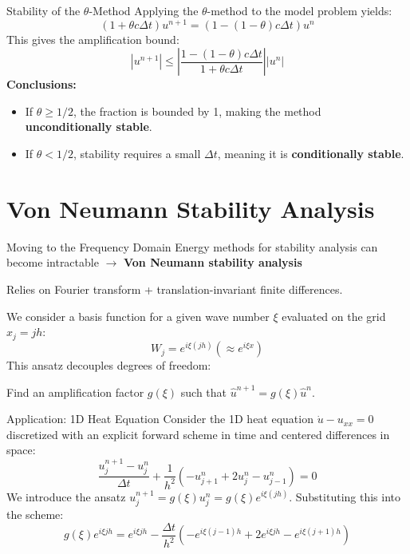 \documentclass[aspectratio=169]{beamer}
\begin{document}
\begin{frame}{Stability of the $\theta$-Method}
    Applying the $\theta$-method to the model problem yields:
    \[
        (1 + \theta c \Delta t)u^{n+1} = (1 - (1-\theta)c\Delta t)u^n 
    \]
    This gives the amplification bound:
    \[
        |u^{n+1}| \le \left| \frac{1 - (1-\theta)c\Delta t}{1 + \theta c\Delta t} \right| |u^n| 
    \]
    \textbf{Conclusions:}
    \begin{itemize}
        \item If $\theta \ge 1/2$, the fraction is bounded by 1, making the method \textbf{unconditionally stable}.
        \item If $\theta < 1/2$, stability requires a small $\Delta t$, meaning it is \textbf{conditionally stable}.
    \end{itemize}
\end{frame}

\section{Von Neumann Stability Analysis}

\begin{frame}{Moving to the Frequency Domain}
    Energy methods for stability analysis can become intractable $\to$  \textbf{Von Neumann stability analysis}
    
    Relies on Fourier transform + translation-invariant finite differences.
    
    We consider a basis function for a given wave number $\xi$ evaluated on the grid $x_j = jh$:
    \[
        W_j = e^{i\xi(jh)} (\approx e^{i\xi x})
    \]
    This ansatz decouples degrees of freedom:
        
    \vspace{1cm}
      Find an amplification factor $g(\xi)$ such that $\hat{u}^{n+1} = g(\xi)\hat{u}^n$.
\end{frame}

\begin{frame}{Application: 1D Heat Equation}
    Consider the 1D heat equation $\dot{u} - u_{xx} = 0$ discretized with an explicit forward scheme in time and centered differences in space:
    \[
        \frac{u_j^{n+1} - u_j^n}{\Delta t} + \frac{1}{h^2}(-u_{j+1}^n + 2u_j^n - u_{j-1}^n) = 0 
    \]
    We introduce the ansatz $u_j^{n+1} = g(\xi) u_j^n = g(\xi) e^{i\xi(jh)}$. Substituting this into the scheme:
    \[
        g(\xi) e^{i\xi jh} = e^{i\xi jh} - \frac{\Delta t}{h^2} \left( -e^{i\xi(j-1)h} + 2e^{i\xi jh} - e^{i\xi(j+1)h} \right) 
    \]
\end{frame}
\end{document}
